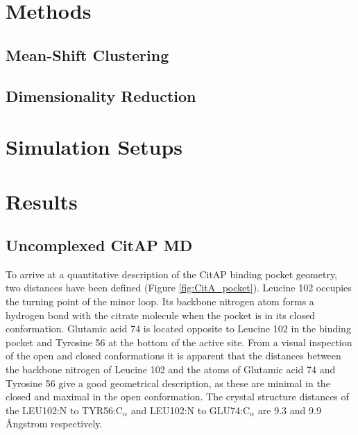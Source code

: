 \documentclass[english, a4paper, 12pt, titlepage, draft]{article}
\begin{document}
\section{Methods}
\subsection{Mean-Shift Clustering}
\label{sec:meanShift} 
\subsection{Dimensionality Reduction}
\label{sec:DimRed} 
\section{Simulation Setups}


\section{Results}

\subsection{Uncomplexed CitAP MD}

To arrive at a quantitative description of the CitAP binding pocket geometry, two distances have been defined (Figure \ref{fig:CitA_pocket}).
Leucine 102 occupies the turning point of the minor loop.
Its backbone nitrogen atom forms a hydrogen bond with the citrate molecule when the pocket is in its closed conformation.
Glutamic acid 74 is located opposite to Leucine 102 in the binding pocket and Tyrosine 56 at the bottom of the active site.
From a visual inspection of the open and closed conformations it is apparent that the distances between the backbone nitrogen of Leucine 102 and the  atoms of Glutamic acid 74 and Tyrosine 56 give a good geometrical description, as these are minimal in the closed and maximal in the open conformation.
The crystal structure distances of the LEU102:N to TYR56:C$_{\alpha}$ and LEU102:N to GLU74:C$_{\alpha}$ are 9.3 and 9.9 \r{A}ngstrom respectively.
\end{document}
